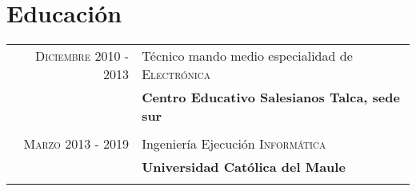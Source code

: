 \documentclass[a4paper,10pt]{article} %
\begin{document}






\section{Educaci\'on}

\begin{tabular}{rl}	
\textsc{Diciembre} 2010 - 2013 & T\'ecnico mando medio especialidad de  \textsc{Electr\'onica}\\
& \textbf{Centro Educativo Salesianos Talca, sede sur}\\
&\\


\textsc{Marzo} 2013 - 2019& Ingenier\'ia Ejecuci\'on \textsc{Inform\'atica}\\
& \textbf{Universidad Cat\'olica del Maule}\\
&\\


\end{tabular}

\end{document}

